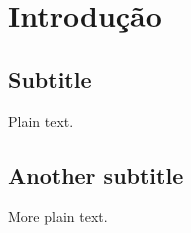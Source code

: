 \documentclass{article}
\begin{document}
\section{Introdução}

\subsection{Subtitle}

Plain text.

\subsection{Another subtitle}

More plain text.
\end{document}
